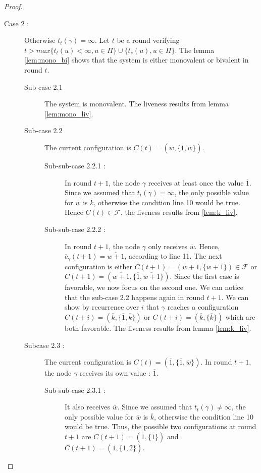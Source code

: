 \documentclass{article}
\newcommand{\cent}{\gamma}
\newcommand{\ts}{t_{s}}
\newcommand{\try}{t_{t}}
\begin{document}
\begin{proof}
\begin{description}
		\item[Case 2 :] Otherwise $\try(\cent) = \infty$.
			Let $t$ be a round verifying $t > max \{\try(u) < \infty, u \in \Pi\} \cup \{\ts(u), u \in \Pi\}$.
			The lemma \ref{lem:mono_bi} shows that the system is either monovalent or bivalent in round $t$.
			\begin{description}
				\item[Sub-case 2.1] The system is monovalent. The liveness results from lemma \ref{lem:mono_liv}.
				\item[Sub-case 2.2] The current configuration is $C(t) = (\overline{w}, \{\overline{1}, \overline{w}\})$.
					\begin{description}
						\item[Sub-sub-case 2.2.1 : ] In round $t+1$, the node $\cent$ receives at least once
							the value $\overline{1}$.
							Since we assumed that $\try(\cent) = \infty$, the only possible value for $\overline{w}$ is $\overline{k}$, otherwise the condition line 10 would be true.
							Hence $C(t) \in \mathcal{F}$, the liveness results from \ref{lem:k_liv}.
						\item[Sub-sub-case 2.2.2 : ] In round $t+1$, the node $\cent$ only receives $\overline{w}$.
							Hence, $\overline{c}_\cent(t+1) = \overline{w+1}$, according to line 11.
							The next configuration is either $C(t+1) = (\overline{w}+1, \{\overline{w}+1\}) \in \mathcal{F}$ or $C(t+1) = (\overline{w+1}, \{\overline{1}, \overline{w+1}\})$.
							Since the first case is favorable, we now focus on the second one.
							We can notice that the sub-case 2.2 happens again in round $t+1$.
							We can show by recurrence over $i$ that $\cent$ reaches a configuration $C(t+i) = (\overline{k}, \{\overline{1}, \overline{k}\})$
							or $C(t+i) = (\overline{k}, \{\overline{k}\})$ which are both favorable.
							The liveness results from lemma \ref{lem:k_liv}.
					\end{description}
				\item[Subcase 2.3 : ] The current configuration is $C(t) = (\overline{1}, \{\overline{1}, \overline{w}\})$.
					In round $t+1$, the node $\cent$ receives its own value : $\overline{1}$.
					\begin{description}
						\item[Sub-sub-case 2.3.1 : ] It also receives $\overline{w}$.
							Since we assumed that $\try(\cent) \neq \infty$, the only possible value for $\overline{w}$ is $\overline{k}$, otherwise the condition line 10 would be true.
							Thus, the possible two configurations at round $t+1$ are $C(t+1) = (\overline{1}, \{\overline{1}\})$ and $C(t+1) = (\overline{1}, \{\overline{1}, \overline{2}\})$.

\end{description}
\end{description}
\end{description}
\end{proof}
\end{document}
